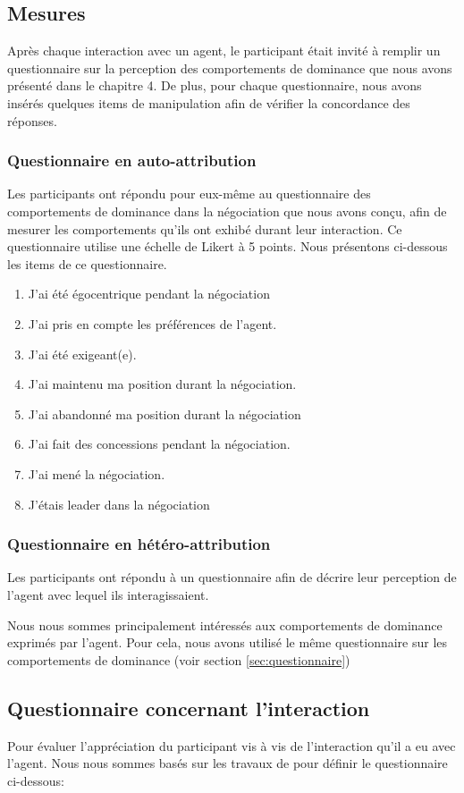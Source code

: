\subsection{Mesures}
Après chaque interaction avec un agent, le participant était invité à remplir un questionnaire sur la perception des comportements de dominance que nous avons présenté dans le chapitre 4. De plus, pour chaque questionnaire, nous avons insérés quelques items de manipulation afin de vérifier la concordance des réponses. 

\subsubsection{Questionnaire en auto-attribution} Les participants ont répondu pour eux-même au questionnaire des comportements de dominance dans la négociation que nous avons conçu, afin de mesurer les comportements qu'ils ont exhibé durant leur interaction. Ce questionnaire utilise une échelle de Likert à 5 points. Nous présentons ci-dessous les items de ce questionnaire. 
\begin{enumerate}
	\item J'ai été égocentrique pendant la négociation
	\item J'ai pris en compte les préférences de l'agent.
	\item J'ai été exigeant(e).
	\item J'ai maintenu ma position durant la négociation.
	\item J'ai abandonné ma position durant la négociation
	\item J'ai fait des concessions pendant la négociation.	
	\item J'ai mené la négociation.
	\item J'étais leader dans la négociation
\end{enumerate}

\subsubsection{Questionnaire en hétéro-attribution}
Les participants ont répondu à un questionnaire afin de décrire leur perception de l’agent avec lequel ils interagissaient.

Nous nous sommes principalement intéressés aux comportements de dominance exprimés par l'agent. Pour cela, nous avons utilisé le même questionnaire sur les comportements de dominance (voir section \ref{sec:questionnaire})

\subsection{Questionnaire concernant l'interaction}
Pour évaluer l'appréciation du participant vis à vis de l'interaction qu'il a eu avec l'agent. Nous nous sommes basés sur les travaux de \cite{tiedens2003power,wiltermuth2009benefits,olekalns2013dyadic} pour définir le questionnaire ci-dessous:

